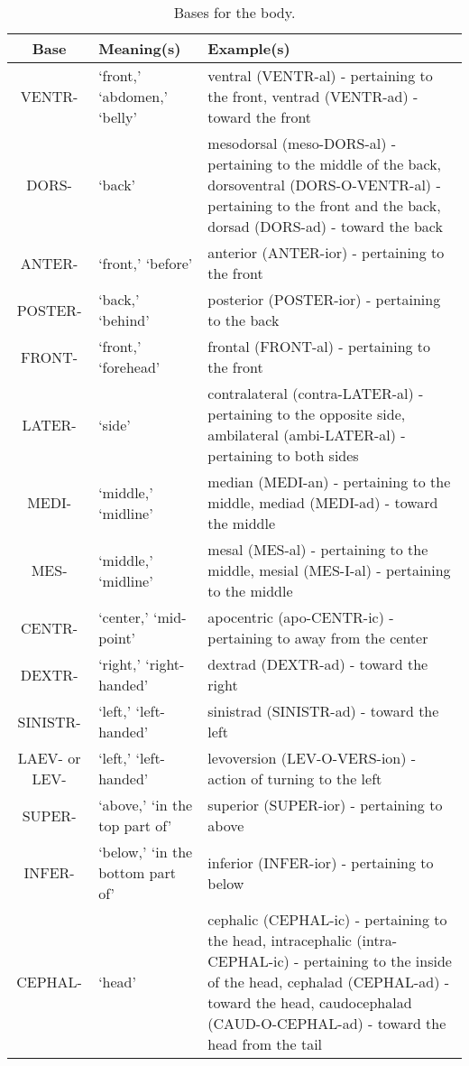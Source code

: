 \begin{longtable}{c | p{} | p{}}
    \caption{Bases for the body.}
    \hline 
    Base & Meaning(s) & Example(s) \\ \hline
    VENTR- & `front,' `abdomen,' `belly' & ventral (VENTR-al) - pertaining to the front, ventrad (VENTR-ad) - toward the front \\
    DORS- & `back' & mesodorsal (meso-DORS-al) - pertaining to the middle of the back, dorsoventral (DORS-O-VENTR-al) - pertaining to the front and the back, dorsad (DORS-ad) - toward the back \\
    ANTER- & `front,' `before' & anterior (ANTER-ior) - pertaining to the front \\
    POSTER- & `back,' `behind' & posterior (POSTER-ior) - pertaining to the back \\
    FRONT- & `front,' `forehead' & frontal (FRONT-al) - pertaining to the front \\
    LATER- & `side' & contralateral (contra-LATER-al) - pertaining to the opposite side, ambilateral (ambi-LATER-al) - pertaining to both sides \\
    MEDI- & `middle,' `midline' & median (MEDI-an) - pertaining to the middle, mediad (MEDI-ad) - toward the middle \\
    MES- & `middle,' `midline' & mesal (MES-al) - pertaining to the middle, mesial (MES-I-al) - pertaining to the middle \\
    CENTR- & `center,' `mid-point' & apocentric (apo-CENTR-ic) - pertaining to away from the center \\
    DEXTR- & `right,' `right-handed' & dextrad (DEXTR-ad) - toward the right \\
    SINISTR- & `left,' `left-handed' & sinistrad (SINISTR-ad) - toward the left \\
    LAEV- or LEV- & `left,' `left-handed' & levoversion (LEV-O-VERS-ion) - action of turning to the left \\
    SUPER- & `above,' `in the top part of' & superior (SUPER-ior) - pertaining to above \\
    INFER- & `below,' `in the bottom part of' & inferior (INFER-ior) - pertaining to below \\
    CEPHAL- & `head' & cephalic (CEPHAL-ic) - pertaining to the head, intracephalic (intra-CEPHAL-ic) - pertaining to the inside of the head, cephalad (CEPHAL-ad) - toward the head, caudocephalad (CAUD-O-CEPHAL-ad) - toward the head from the tail \\

\end{longtable}

